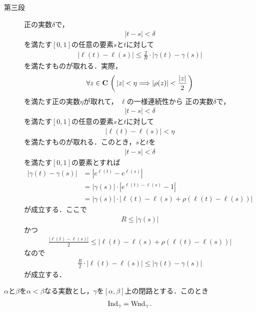 \begin{sketch}
\begin{description}
			\item[第三段]
				正の実数$\delta$で，
				\begin{align}
					|t - s| < \delta
				\end{align}
				を満たす$[0,1]$の任意の要素$s$と$t$に対して
				\begin{align}
					|\ell(t) - \ell(s)| \leq \frac{2}{R} \cdot |\gamma(t) - \gamma(s)|
				\end{align}
				を満たすものが取れる．実際，
				\begin{align}
					\forall z \in \mathbf{C}\,
					\left(\, |z| < \eta \Longrightarrow |\rho(z)| < \frac{|z|}{2}\, \right)
				\end{align}
				を満たす正の実数$\eta$が取れて，
				$\ell$の一様連続性から
				正の実数$\delta$で，
				\begin{align}
					|t - s| < \delta
				\end{align}
				を満たす$[0,1]$の任意の要素$s$と$t$に対して
				\begin{align}
					|\ell(t) - \ell(s)| < \eta
				\end{align}
				を満たすものが取れる．このとき，$s$と$t$を
				\begin{align}
					|t - s| < \delta
				\end{align}
				を満たす$[0,1]$の要素とすれば
				\begin{align}
					|\gamma(t) - \gamma(s)|
					&= \left| e^{\ell(t)} - e^{\ell(s)} \right| \\
					&= |\gamma(s)| \cdot \left| e^{\ell(t) - \ell(s)} - 1 \right| \\
					&= |\gamma(s)| \cdot \left| \ell(t) - \ell(s) + \rho(\ell(t) - \ell(s)) \right|
				\end{align}
				が成立する．ここで
				\begin{align}
					R \leq |\gamma(s)|
				\end{align}
				かつ
				\begin{align}
					\frac{|\ell(t) - \ell(s)|}{2} \leq \left| \ell(t) - \ell(s) + \rho(\ell(t) - \ell(s)) \right|
				\end{align}
				なので
				\begin{align}
					\frac{R}{2} \cdot |\ell(t) - \ell(s)| \leq |\gamma(t) - \gamma(s)|
				\end{align}
				が成立する．
				\QED
		\end{description}
	\end{sketch}
	
	\begin{screen}
		\begin{thm}[閉路の指数と回転数は一致する]
			$\alpha$と$\beta$を$\alpha < \beta$なる実数とし，$\gamma$を$[\alpha,\beta]$上の閉路とする．このとき
			\begin{align}
				\operatorname{Ind}_{\gamma} = \operatorname{Wnd}_{\gamma}.
			\end{align}
		\end{thm}
	\end{screen}
	
